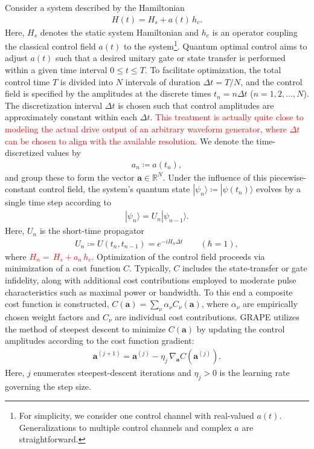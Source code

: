 \documentclass[letterpaper,10pt]{iopart}
\newcommand{\dket}[1]{|#1\rangle}
\newcommand\revise[1]{\textcolor{red}{#1}}
\newcommand{\parenthesis}[1]{\left(#1\right)}
\begin{document}
Consider a system described by the Hamiltonian
\begin{align}
     H(t) = H_s + a(t)\, h_c.
\end{align}
Here, $H_s$ denotes the static system Hamiltonian and $h_c$ is an operator coupling the classical control field $a(t)$ to the system\footnote{For simplicity, we consider one control channel with real-valued $a(t)$. Generalizations to multiple control channels and complex $a$ are straightforward.}. Quantum optimal control aims to adjust $a(t)$ such that a desired unitary gate or state transfer is performed within a given time interval $0\le t \le T$. To facilitate optimization, the total control time $T$ is divided into $N$ intervals of duration $\Delta t=T/N$, and the control field is specified by the amplitudes at the discrete times $t_n=n\Delta t$ ($n=1,2,\dots,N$). The discretization interval $\Delta t$ is chosen such that control amplitudes are approximately constant within each $\Delta t$. \revise{This treatment is actually quite close to modeling the actual drive output of an arbitrary waveform generator, where $\Delta t$ can be chosen to align with the available resolution.} We denote the time-discretized values by
\begin{align}
\label{eq2}
    a_n \coloneqq a(t_n),
\end{align}
and group these to form the vector $\textbf{a}\in \mathbb{R}^{N}$.  
Under the influence of this piecewise-constant control field, the system's quantum state $\dket{\psi_n}\coloneqq \dket{\psi(t_n)}$ evolves by a single time step according to 
\begin{align}
\label{statepropagation}
  |\psi_n\rangle=U_n|\psi_{n-1}\rangle.
\end{align}
Here, $U_n$ is the short-time propagator
\begin{align}
\label{propagator}
  U_n\coloneqq U(t_n, t_{n-1}) =e^{-iH_n\Delta t}\qquad(\hbar=1),
\end{align}
where \revise{$H_n=\, H_s+a_n\, h_c $}. Optimization of the control field proceeds via minimization of a cost function $C$. Typically, $C$ includes the state-transfer or gate infidelity, along with additional cost contributions employed to moderate pulse characteristics such as maximal power or bandwidth. To this end a composite cost function is constructed, $C(\textbf{a})=\sum_{\nu}\alpha_\nu C_\nu \parenthesis{\textbf{a}}$, where $\alpha_\nu$ are empirically chosen weight factors and $C_\nu$ are individual cost contributions. GRAPE utilizes the method of steepest descent to minimize $C(\textbf{a})$ by updating the control amplitudes according to the cost function gradient: 
\begin{align}
  \textbf{a}^{(j+1)}=\textbf{a}^{(j)}-\eta_j\,\nabla_{\textbf{a}}C(\textbf{a}^{(j)}).
\end{align}
Here, $j$ enumerates steepest-descent iterations and $\eta_j>0$ is the learning rate governing the step size. 
\end{document}
